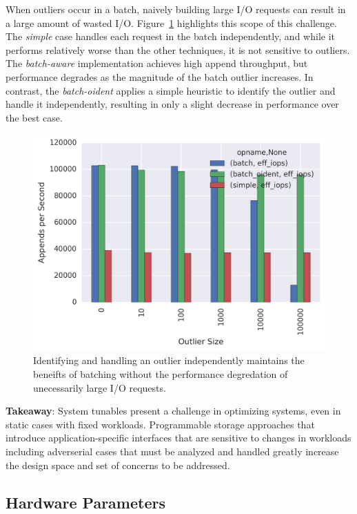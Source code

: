 When outliers occur in a batch, naively building large I/O requests can result
in a large amount of wasted I/O.  Figure~\ref{fig:batching-outlier} highlights
this scope of this challenge. The \emph{simple} case handles each request in
the batch independently, and while it performs relatively worse than the other
techniques, it is not sensitive to outliers. The \emph{batch-aware}
implementation achieves high append throughput, but performance degrades as
the magnitude of the batch outlier increases. In contrast, the
\emph{batch-oident} applies a simple heuristic to identify the outlier and
handle it independently, resulting in only a slight decrease in performance
over the best case.

\begin{figure}
\centering
\includegraphics[width=1.0\linewidth]{batching-outlier-detect.png}
\caption{Identifying and handling an outlier independently maintains the
beneifts of batching without the performance degredation of unecessarily
large I/O requests.}
\label{fig:batching-outlier}
\end{figure}

\textbf{Takeaway}: System tunables present a challenge in optimizing systems,
even in static cases with fixed workloads. Programmable storage approaches
that introduce application-specific interfaces that are sensitive to changes
in workloads including adverserial cases that must be analyzed and handled
greatly increase the design space and set of concerns to be addressed.

\subsection{Hardware Parameters}

